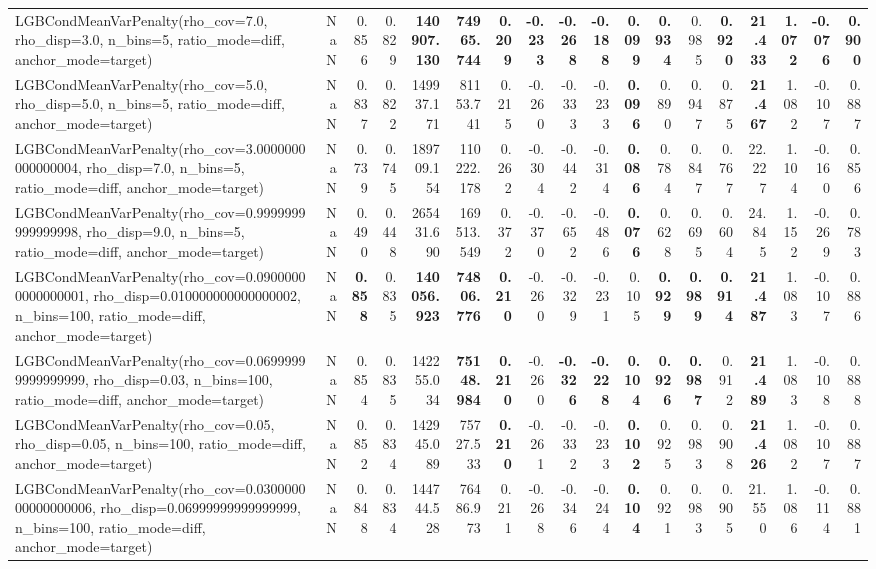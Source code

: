 \documentclass[11pt]{article}
\theoremstyle{plain}
\theoremstyle{definition}
\newcommand{\1}{\mathbf{1}}
\begin{document}
\begin{table}[htbp]
{\begin{tabular}{lrrrrrrrrrrrrrrrrr}
LGBCondMeanVarPenalty(rho\_cov=7.0, rho\_disp=3.0, n\_bins=5, ratio\_mode=diff, anchor\_mode=target) & NaN & 0.856 & 0.829 & \textbf{140907.130} & \textbf{74965.744} & \textbf{0.209} & \textbf{-0.233} & \textbf{-0.268} & \textbf{-0.188} & \textbf{0.099} & \textbf{0.934} & 0.985 & \textbf{0.920} & \textbf{21.433} & \textbf{1.072} & \textbf{-0.076} & \textbf{0.900} \\
LGBCondMeanVarPenalty(rho\_cov=5.0, rho\_disp=5.0, n\_bins=5, ratio\_mode=diff, anchor\_mode=target) & NaN & 0.837 & 0.822 & 149937.171 & 81153.741 & 0.215 & -0.260 & -0.333 & -0.233 & \textbf{0.096} & 0.890 & 0.947 & 0.875 & \textbf{21.467} & 1.082 & -0.107 & 0.887 \\
LGBCondMeanVarPenalty(rho\_cov=3.0000000000000004, rho\_disp=7.0, n\_bins=5, ratio\_mode=diff, anchor\_mode=target) & NaN & 0.739 & 0.745 & 189709.154 & 110222.178 & 0.262 & -0.304 & -0.442 & -0.314 & \textbf{0.086} & 0.784 & 0.847 & 0.767 & 22.227 & 1.104 & -0.160 & 0.856 \\
LGBCondMeanVarPenalty(rho\_cov=0.9999999999999998, rho\_disp=9.0, n\_bins=5, ratio\_mode=diff, anchor\_mode=target) & NaN & 0.490 & 0.448 & 265431.690 & 169513.549 & 0.372 & -0.370 & -0.652 & -0.486 & \textbf{0.076} & 0.628 & 0.695 & 0.604 & 24.845 & 1.152 & -0.269 & 0.783 \\
LGBCondMeanVarPenalty(rho\_cov=0.09000000000000001, rho\_disp=0.010000000000000002, n\_bins=100, ratio\_mode=diff, anchor\_mode=target) & NaN & \textbf{0.858} & 0.835 & \textbf{140056.923} & \textbf{74806.776} & \textbf{0.210} & -0.260 & -0.329 & -0.231 & 0.105 & \textbf{0.929} & \textbf{0.989} & \textbf{0.914} & \textbf{21.487} & 1.083 & -0.107 & 0.886 \\
LGBCondMeanVarPenalty(rho\_cov=0.06999999999999999, rho\_disp=0.03, n\_bins=100, ratio\_mode=diff, anchor\_mode=target) & NaN & 0.854 & 0.835 & 142255.034 & \textbf{75148.984} & \textbf{0.210} & -0.260 & \textbf{-0.326} & \textbf{-0.228} & \textbf{0.104} & \textbf{0.926} & \textbf{0.987} & 0.912 & \textbf{21.489} & 1.083 & -0.108 & 0.888 \\
LGBCondMeanVarPenalty(rho\_cov=0.05, rho\_disp=0.05, n\_bins=100, ratio\_mode=diff, anchor\_mode=target) & NaN & 0.852 & 0.834 & 142945.089 & 75727.533 & \textbf{0.210} & -0.261 & -0.332 & -0.233 & \textbf{0.102} & 0.925 & 0.983 & 0.908 & \textbf{21.426} & 1.082 & -0.107 & 0.887 \\
LGBCondMeanVarPenalty(rho\_cov=0.030000000000000006, rho\_disp=0.06999999999999999, n\_bins=100, ratio\_mode=diff, anchor\_mode=target) & NaN & 0.848 & 0.834 & 144744.528 & 76486.973 & 0.211 & -0.268 & -0.346 & -0.244 & \textbf{0.104} & 0.921 & 0.983 & 0.905 & 21.550 & 1.086 & -0.114 & 0.881 \\

\end{tabular}}
\end{table}
\end{document}
